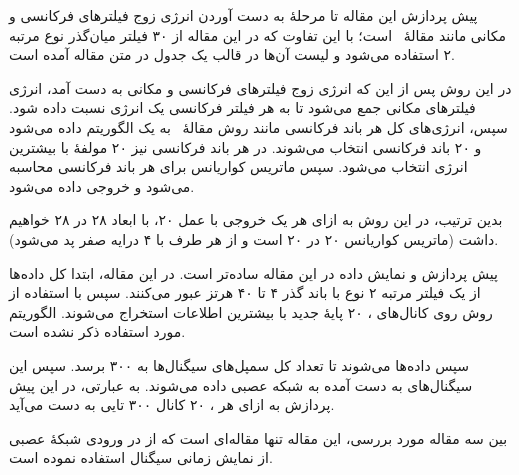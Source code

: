 پیش پردازش این مقاله تا مرحلهٔ به دست آوردن انرژی زوج فیلترهای فرکانسی و مکانی مانند مقالهٔ \آ\ است؛ با این تفاوت که در این مقاله از ۳۰ فیلتر میان‌گذر نوع  مرتبه ۲ استفاده می‌شود و لیست آن‌ها در قالب یک جدول در متن مقاله آمده است.

در این روش پس از این که انرژی زوج فیلترهای فرکانسی و مکانی به دست آمد، انرژی فیلترهای مکانی جمع می‌شود تا به هر فیلتر فرکانسی یک انرژی نسبت داده شود. سپس، انرژی‌های کل هر باند فرکانسی مانند روش مقالهٔ \آ\ به یک الگوریتم  داده می‌شود و ۲۰ باند فرکانسی انتخاب می‌شوند. در هر باند فرکانسی نیز ۲۰ مولفهٔ  با بیشترین انرژی انتخاب می‌شود. سپس ماتریس کواریانس برای هر باند فرکانسی محاسبه می‌شود و خروجی داده می‌شود.

بدین ترتیب، در این روش به ازای هر  یک خروجی با عمل ۲۰، با ابعاد ۲۸ در ۲۸ خواهیم داشت (ماتریس کواریانس ۲۰ در ۲۰ است و از هر طرف با ۴ درایه صفر پد می‌شود).

پیش پردازش و نمایش داده در این مقاله ساده‌تر است. در این مقاله، ابتدا کل داده‌ها از یک فیلتر مرتبه ۲ نوع  با باند گذر ۴ تا ۴۰ هرتز عبور می‌کنند. سپس با استفاده از روش  روی کانال‌های ، ۲۰ پایهٔ جدید با بیشترین اطلاعات استخراج می‌شوند. الگوریتم  مورد استفاده ذکر نشده است.

سپس داده‌ها  می‌شوند تا تعداد کل سمپل‌های سیگنال‌ها به ۳۰۰ برسد. سپس این سیگنال‌های به دست آمده به شبکه عصبی داده می‌شوند. به عبارتی، در این پیش پردازش به ازای هر ، ۲۰ کانال ۳۰۰ تایی به دست می‌آید.

بین سه مقاله مورد بررسی، این مقاله تنها مقاله‌ای است که از در ورودی شبکهٔ عصبی از نمایش زمانی سیگنال استفاده نموده است.


